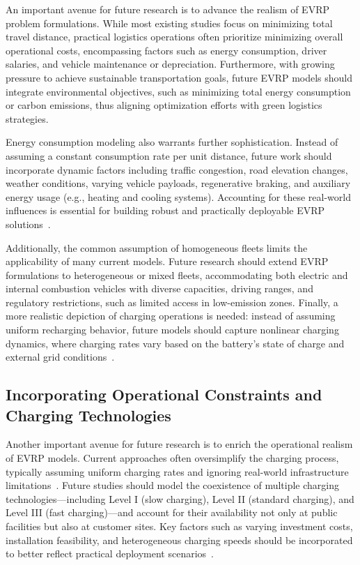 An important avenue for future research is to advance the realism of EVRP problem formulations.  
While most existing studies focus on minimizing total travel distance, practical logistics operations often prioritize minimizing overall operational costs, encompassing factors such as energy consumption, driver salaries, and vehicle maintenance or depreciation.  
Furthermore, with growing pressure to achieve sustainable transportation goals, future EVRP models should integrate environmental objectives, such as minimizing total energy consumption or carbon emissions, thus aligning optimization efforts with green logistics strategies.

Energy consumption modeling also warrants further sophistication.  
Instead of assuming a constant consumption rate per unit distance, future work should incorporate dynamic factors including traffic congestion, road elevation changes, weather conditions, varying vehicle payloads, regenerative braking, and auxiliary energy usage (e.g., heating and cooling systems).  
Accounting for these real-world influences is essential for building robust and practically deployable EVRP solutions~\cite{fang2025two}.

Additionally, the common assumption of homogeneous fleets limits the applicability of many current models.  
Future research should extend EVRP formulations to heterogeneous or mixed fleets, accommodating both electric and internal combustion vehicles with diverse capacities, driving ranges, and regulatory restrictions, such as limited access in low-emission zones.  
Finally, a more realistic depiction of charging operations is needed: instead of assuming uniform recharging behavior, future models should capture nonlinear charging dynamics, where charging rates vary based on the battery’s state of charge and external grid conditions~\cite{zhang2023robust}.



\subsection{Incorporating Operational Constraints and Charging Technologies}

Another important avenue for future research is to enrich the operational realism of EVRP models. Current approaches often oversimplify the charging process, typically assuming uniform charging rates and ignoring real-world infrastructure limitations~\cite{rahman2016review}.  
Future studies should model the coexistence of multiple charging technologies—including Level I (slow charging), Level II (standard charging), and Level III (fast charging)—and account for their availability not only at public facilities but also at customer sites. Key factors such as varying investment costs, installation feasibility, and heterogeneous charging speeds should be incorporated to better reflect practical deployment scenarios~\cite{margaritis2016electric,awasthi2017optimal}.

